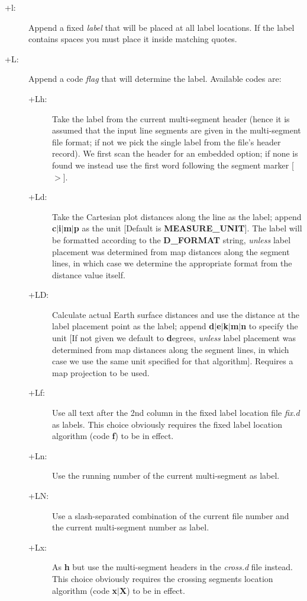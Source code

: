 \begin{description}
\item [+l:] Append a fixed {\it label} that will be placed at all label locations.  If the label contains
spaces you must place it inside matching quotes.
\item [+L:] Append a code {\it flag} that will determine the label.  Available codes are:
\begin{description}
\item [+Lh:]  Take the label from the current multi-segment header (hence it is assumed that the
input line segments are given in the multi-segment file format; if not we pick the single label
from the file's header record).  We first scan the header for an embedded
 option; if none is found we instead use the first word following the segment marker [$>$].
\item [+Ld:] Take the Cartesian plot distances along the line as the label; append {\bf c$|$i$|$m$|$p}
as the unit [Default is {\bf MEASURE\_UNIT}].  The label will be formatted according to the {\bf D\_FORMAT}
string, \emph{unless} label placement was determined from map distances along the segment lines, in which
case we determine the appropriate format from the distance value itself. 
\item [+LD:]  Calculate actual Earth surface distances and use the distance at the label placement point as
the label; append {\bf d$|$e$|$k$|$m$|$n} to specify the unit [If not given we default to {\bf d}egrees,
\emph{unless} label placement was determined from map distances along the segment lines, in which case we
use the same unit specified for that algorithm].  Requires a map projection to be used.
\item [+Lf:]  Use all text after the 2nd column in the fixed label location file {\it fix.d} as labels.
This choice obviously requires the fixed label location algorithm (code {\bf f}) to be in effect.
\item [+Ln:]  Use the running number of the current multi-segment as label.
\item [+LN:]  Use a slash-separated combination of the current file number and the current multi-segment number as label.
\item [+Lx:]  As {\bf h} but use the multi-segment headers in the {\it cross.d} file instead.
This choice obviously requires the crossing segments location algorithm (code {\bf x$|$X}) to be in effect.
\end{description}
\end{description}

